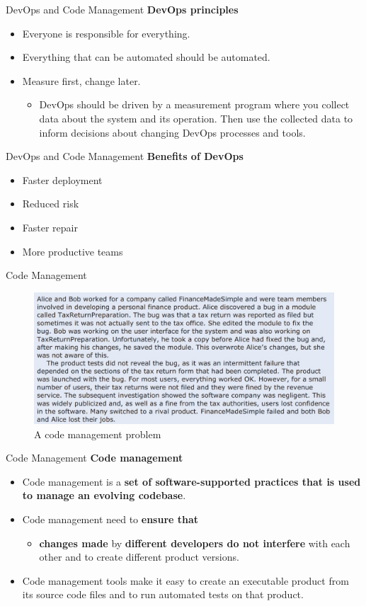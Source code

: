 \documentclass{beamer}
\begin{document}
\begin{frame}{DevOps and Code Management}
	\textbf{DevOps principles}
	\begin{itemize}
		\item Everyone is responsible for 
		everything.
		\item Everything that can be automated 
		should be automated.
		\item Measure first, change later.
		\begin{itemize}
			\item DevOps should be driven by a measurement program where you collect data about the system and its operation. Then use the collected data to inform decisions about changing DevOps processes and tools.
			
		\end{itemize}
	\end{itemize}
\end{frame}
\begin{frame}{DevOps and Code Management}
\textbf{Benefits of DevOps}
\begin{itemize}
	\item Faster deployment
	\item Reduced risk
	\item Faster repair
	\item More productive teams
\end{itemize}
\end{frame}
\begin{frame}{Code Management}
	\begin{figure}
		\includegraphics[scale=.45]{img/m3_36}
		\caption{A code management problem}
	\end{figure}
\end{frame}
\begin{frame}{Code Management}
\textbf{Code management}
\begin{itemize}
	\item Code management is a \textbf{set of software-supported practices that is used to manage an evolving codebase}. 
	\item Code management need to \textbf{ensure that}
	\begin{itemize}
		\item  \textbf{changes made} by\textbf{ different developers do not interfere} with each other and to create different product versions. 
	\end{itemize} 
	\item Code management tools make it easy to create an executable product from its source code files and to run automated tests on that product.
\end{itemize}
\end{frame}
\end{document}
